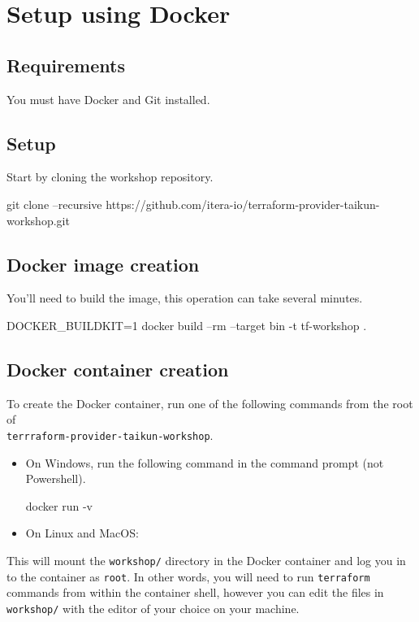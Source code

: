 \section{Setup using Docker}\label{sec:docker}

\subsection{Requirements}
You must have Docker and Git installed.

\subsection{Setup}
Start by cloning the workshop repository.
\begin{shell}
git clone --recursive https://github.com/itera-io/terraform-provider-taikun-workshop.git
\end{shell}

\subsection{Docker image creation}
You'll need to build the image, this operation can take several minutes.
\begin{shell}
DOCKER_BUILDKIT=1 docker build --rm --target bin -t tf-workshop .
\end{shell}

\subsection{Docker container creation}
To create the Docker container, run one of the following commands from the root of \\
\texttt{terrraform-provider-taikun-workshop}.
\begin{itemize}
  \item On Windows, run the following command in the command prompt (not Powershell).
  \begin{cmd}
docker run -v %
  \end{cmd}
  \item On Linux and MacOS:
\end{itemize}
This will mount the \texttt{workshop/} directory in the Docker container and
log you in to the container as \texttt{root}.
In other words, you will need to run \texttt{terraform} commands from within
the container shell, however you can edit the files in \texttt{workshop/}
with the editor of your choice on your machine.\\

